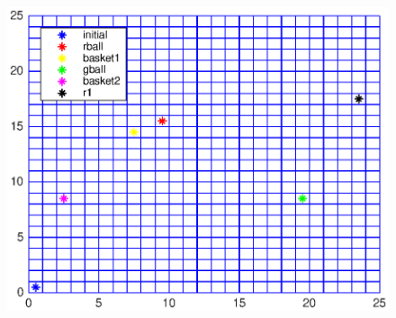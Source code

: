 \begin{figure}[!htb]
\centering
\includegraphics[scale=1]{workspace2.eps}
\label{fig:workspace2}
\end{figure}



